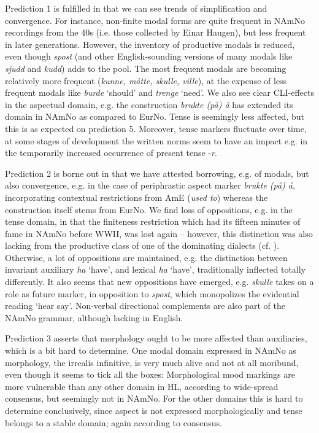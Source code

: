 \documentclass[output=paper]{langscibook}
\begin{document}
Prediction 1 is fulfilled in that we can see trends of simplification and convergence. For instance, non-finite modal forms are quite frequent in NAmNo recordings from the 40s (i.e. those collected by Einar Haugen), but less frequent in later generations. However, the inventory of productive modals is reduced, even though \textit{spost} (and other English-sounding versions of many modals like \textit{sjudd} and \textit{kudd}) adds to the pool. The most frequent modals are becoming relatively more frequent (\textit{kunne, måtte, skulle, ville}), at the expense of less frequent modals like \textit{burde} ‘should’ and \textit{trenge} ‘need’. We also see clear CLI-effects in the aspectual domain, e.g. the construction \textit{brukte (på) å} has extended its domain in NAmNo as compared to EurNo. Tense is seemingly less affected, but this is as expected on prediction 5. Moreover, tense markers fluctuate over time, at some stages of development the written norms seem to have an impact e.g. in the temporarily increased occurrence of present tense -\textit{r}. 

Prediction 2 is borne out in that we have attested borrowing, e.g. of modals, but also convergence, e.g. in the case of periphrastic aspect marker \textit{brukte (på) å}, incorporating contextual restrictions from AmE (\textit{used to}) whereas the construction itself stems from EurNo. We find loss of oppositions, e.g. in the tense domain, in that the finiteness restriction which had its fifteen minutes of fame in NAmNo before WWII, was lost again – however, this distinction was also lacking from the productive class of one of the dominating dialects (cf. ). Otherwise, a lot of oppositions are maintained, e.g. the distinction between invariant auxiliary \textit{ha} ‘have’, and lexical \textit{ha} ‘have’, traditionally inflected totally differently. It also seems that new oppositions have emerged, e.g. \textit{skulle} takes on a role as future marker, in opposition to \textit{spost}, which monopolizes the evidential reading ‘hear say’. Non-verbal directional complements are also part of the NAmNo grammar, although lacking in English.

Prediction 3 asserts that morphology ought to be more affected than auxiliaries, which is a bit hard to determine. One modal domain expressed in NAmNo as morphology, the irrealis infinitive, is very much alive and not at all moribund, even though it seems to tick all the boxes: Morphological mood markings are more vulnerable than any other domain in HL, according to wide-spread consensus, but seemingly not in NAmNo. For the other domains this is hard to determine conclusively, since aspect is not expressed morphologically and tense belongs to a stable domain; again according to consensus. 
\end{document}
